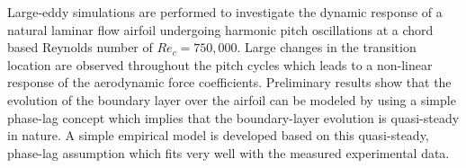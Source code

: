 \begin{paper}

\makepapertitle

%
\begin{paperabstract}
	Large-eddy simulations are performed to investigate the dynamic response of a natural laminar flow airfoil undergoing harmonic pitch oscillations at a chord based Reynolds number of $Re_{c}=750,000$. Large changes in the transition location are observed throughout the pitch cycles which leads to a non-linear response of the aerodynamic force coefficients. Preliminary results show that the evolution of the boundary layer over the airfoil can be modeled by using a simple phase-lag concept which implies that the boundary-layer evolution is quasi-steady in nature. A simple empirical model is developed based on this quasi-steady, phase-lag assumption which fits very well with the measured experimental data.
\end{paperabstract}


%




%


%


\end{paper}
